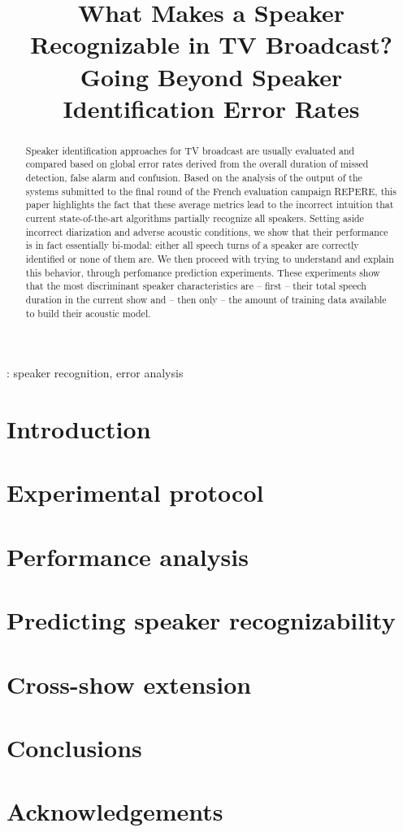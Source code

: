 \documentclass[a4paper]{article}
\title{What Makes a Speaker Recognizable in TV Broadcast?\\
Going Beyond Speaker Identification Error Rates}
\begin{document}
\maketitle

\begin{abstract}
Speaker identification approaches for TV broadcast are usually evaluated and compared based on global error rates derived from the overall duration of missed detection, false alarm and confusion.
Based on the analysis of the output of the systems submitted to the final round of the French evaluation campaign REPERE, this paper highlights the fact that these average metrics lead to the incorrect intuition that current state-of-the-art algorithms partially recognize all speakers. Setting aside incorrect diarization and adverse acoustic conditions, we show that their performance is in fact essentially bi-modal: either all speech turns of a speaker are correctly identified or none of them are. We then proceed with trying to understand and explain this behavior, through perfomance prediction experiments. These experiments show that the most discriminant speaker characteristics are -- first -- their total speech duration in the current show and -- then only -- the amount of training data available to build their acoustic model.
\end{abstract}

: speaker recognition, error analysis

\section{Introduction}
\label{sec:introduction}


\section{Experimental protocol}
\label{sec:protocol}


\section{Performance analysis}
\label{sec:analysis}


\section{Predicting speaker recognizability}
\label{sec:prediction}


\section{Cross-show extension}
\label{sec:xshow}


\section{Conclusions}
\label{sec:conclusion}


\section{Acknowledgements}

\newpage
\eightpt



\end{document}
